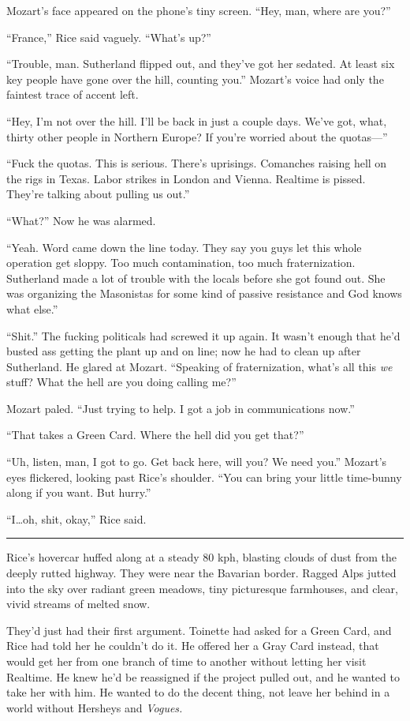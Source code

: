 Mozart's face appeared on the phone's tiny screen. ``Hey, man, where are you?''

``France,'' Rice said vaguely. ``What's up?''

``Trouble, man. Sutherland flipped out, and they've got her sedated. At least six key people have gone over the hill, counting you.'' Mozart's voice had only the faintest trace of accent left.

``Hey, I'm not over the hill. I'll be back in just a couple days. We've got, what, thirty other people in Northern Europe? If you're worried about the quotas—''

``Fuck the quotas. This is serious. There's uprisings. Comanches raising hell on the rigs in Texas. Labor strikes in London and Vienna. Realtime is pissed. They're talking about pulling us out.''

``What?'' Now he was alarmed.

``Yeah. Word came down the line today. They say you guys let this whole operation get sloppy. Too much contamination, too much fraternization. Sutherland made a lot of trouble with the locals before she got found out. She was organizing the Masonistas for some kind of passive resistance and God knows what else.''

``Shit.'' The fucking politicals had screwed it up again. It wasn't enough that he'd busted ass getting the plant up and on line; now he had to clean up after Sutherland. He glared at Mozart. ``Speaking of fraternization, what's all this \textit{we} stuff? What the hell are you doing calling me?''

Mozart paled. ``Just trying to help. I got a job in communications now.''

``That takes a Green Card. Where the hell did you get that?''

``Uh, listen, man, I got to go. Get back here, will you? We need you.'' Mozart's eyes flickered, looking past Rice's shoulder. ``You can bring your little time-bunny along if you want. But hurry.''

``I\ldots oh, shit, okay,'' Rice said.

\fancybreak{* * *}

Rice's hovercar huffed along at a steady 80 kph, blasting clouds of dust from the deeply rutted highway. They were near the Bavarian border. Ragged Alps jutted into the sky over radiant green meadows, tiny picturesque farmhouses, and clear, vivid streams of melted snow.

They'd just had their first argument. Toinette had asked for a Green Card, and Rice had told her he couldn't do it. He offered her a Gray Card instead, that would get her from one branch of time to another without letting her visit Realtime. He knew he'd be reassigned if the project pulled out, and he wanted to take her with him. He wanted to do the decent thing, not leave her behind in a world without Hersheys and \textit{Vogues.}

